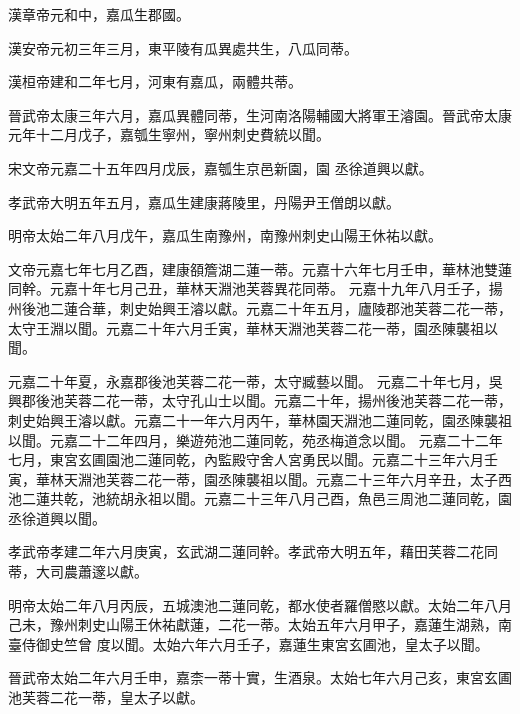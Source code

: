\begin{pinyinscope}
 漢章帝元和中，嘉瓜生郡國。



 漢安帝元初三年三月，東平陵有瓜異處共生，八瓜同蒂。



 漢桓帝建和二年七月，河東有嘉瓜，兩體共蒂。



 晉武帝太康三年六月，嘉瓜異體同蒂，生河南洛陽輔國大將軍王濬園。晉武帝太康元年十二月戊子，嘉瓠生寧州，寧州刺史費統以聞。



 宋文帝元嘉二十五年四月戊辰，嘉瓠生京邑新園，園
 丞徐道興以獻。



 孝武帝大明五年五月，嘉瓜生建康蔣陵里，丹陽尹王僧朗以獻。



 明帝太始二年八月戊午，嘉瓜生南豫州，南豫州刺史山陽王休祐以獻。



 文帝元嘉七年七月乙酉，建康頟簷湖二蓮一蒂。元嘉十六年七月壬申，華林池雙蓮同幹。元嘉十年七月己丑，華林天淵池芙蓉異花同蒂。
 元嘉十九年八月壬子，揚州後池二蓮合華，刺史始興王濬以獻。元嘉二十年五月，廬陵郡池芙蓉二花一蒂，太守王淵以聞。元嘉二十年六月壬寅，華林天淵池芙蓉二花一蒂，園丞陳襲祖以聞。



 元嘉二十年夏，永嘉郡後池芙蓉二花一蒂，太守臧藝以聞。
 元嘉二十年七月，吳興郡後池芙蓉二花一蒂，太守孔山士以聞。元嘉二十年，揚州後池芙蓉二花一蒂，刺史始興王濬以獻。元嘉二十一年六月丙午，華林園天淵池二蓮同乾，園丞陳襲祖以聞。元嘉二十二年四月，樂遊苑池二蓮同乾，苑丞梅道念以聞。
 元嘉二十二年七月，東宮玄圃園池二蓮同乾，內監殿守舍人宮勇民以聞。元嘉二十三年六月壬寅，華林天淵池芙蓉二花一蒂，園丞陳襲祖以聞。元嘉二十三年六月辛丑，太子西池二蓮共乾，池統胡永祖以聞。元嘉二十三年八月己酉，魚邑三周池二蓮同乾，園丞徐道興以聞。



 孝武帝孝建二年六月庚寅，玄武湖二蓮同幹。孝武帝大明五年，藉田芙蓉二花同蒂，大司農蕭邃以獻。



 明帝太始二年八月丙辰，五城澳池二蓮同乾，都水使者羅僧愍以獻。太始二年八月己未，豫州刺史山陽王休祐獻蓮，二花一蒂。太始五年六月甲子，嘉蓮生湖熟，南臺侍御史竺曾
 度以聞。太始六年六月壬子，嘉蓮生東宮玄圃池，皇太子以聞。



 晉武帝太始二年六月壬申，嘉柰一蒂十實，生酒泉。太始七年六月己亥，東宮玄圃池芙蓉二花一蒂，皇太子以獻。




\end{pinyinscope}
